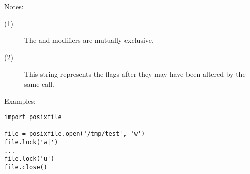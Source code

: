 \noindent
Notes:

\begin{description}
\item[(1)] The \samp{!} and \samp{=} modifiers are mutually exclusive.

\item[(2)] This string represents the flags after they may have been altered
by the same call.
\end{description}

Examples:

\begin{verbatim}
import posixfile

file = posixfile.open('/tmp/test', 'w')
file.lock('w|')
...
file.lock('u')
file.close()
\end{verbatim}
